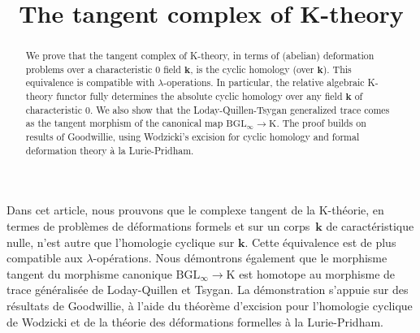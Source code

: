 \documentclass[JEP,XML,SOM,Unicode,NoEqCountersInSection]{cedram}
\theoremstyle{definition}
\begin{document}
\frontmatter
\title{The tangent complex of K-theory}

\author[\initial{B.} \lastname{Hennion}]{ }
\address{IMO - Université Paris-Saclay \\
F-91405 Orsay Cedex, France}

\begin{abstract}
We prove that the tangent complex of K-theory, in terms of (abelian) deformation problems over a characteristic $0$ field $\boldsymbol{k}$, is the cyclic homology (over $\boldsymbol{k}$). This equivalence is compatible with $\lambda$-operations. In particular, the relative algebraic K-theory functor fully determines the absolute cyclic homology over any field ${\boldsymbol{k}}$ of characteristic $0$. We also show that the Loday-Quillen-Tsygan generalized trace comes as the tangent morphism of the canonical map $\mathrm{BGL}_\infty\to\mathrm{K}$. The proof builds on results of Goodwillie, using Wodzicki's excision for cyclic homology and formal deformation theory à la Lurie-Pridham.
\end{abstract}





\begin{altabstract}
Dans cet article, nous prouvons que le complexe tangent de la K-théorie, en termes de problèmes de déformations formels et sur un corps~$\boldsymbol{k}$ de caractéristique nulle, n'est autre que l'homologie cyclique sur $\boldsymbol{k}$. Cette équivalence est de plus compatible aux $\lambda$-opérations. Nous démontrons également que le morphisme tangent du morphisme canonique $\mathrm{BGL}_\infty\to\mathrm{K}$ est homotope au morphisme de trace généralisée de Loday-Quillen et Tsygan. La démonstration s'appuie sur des résultats de Goodwillie, à l'aide du théorème d'excision pour l'homologie cyclique de Wodzicki et de la théorie des déformations formelles à la Lurie-Pridham.
\end{altabstract}
\maketitle
\vspace*{-\baselineskip}
\tableofcontents
\mainmatter
\end{document}
